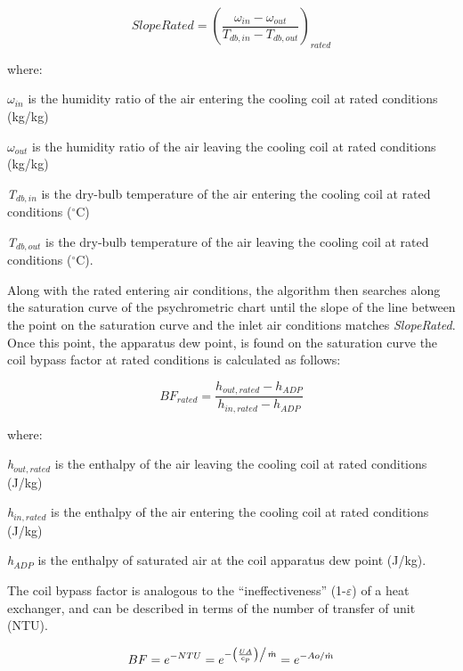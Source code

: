 \begin{equation}
SlopeRated = {\left( {\frac{{{\omega_{in}} - {\omega_{out}}}}{{{T_{db,in}} - {T_{db,out}}}}} \right)_{rated}}
\end{equation}

where:

\emph{\(\omega_{in}\)} is the humidity ratio of the air entering the cooling coil at rated conditions (kg/kg)

\emph{\(\omega_{out}\)} is the humidity ratio of the air leaving the cooling coil at rated conditions (kg/kg)

\emph{T\(_{db,in}\)} is the dry-bulb temperature of the air entering the cooling coil at rated conditions (\(^{\circ}\)C)

\emph{T\(_{db,out}\)} is the dry-bulb temperature of the air leaving the cooling coil at rated conditions (\(^{\circ}\)C).

Along with the rated entering air conditions, the algorithm then searches along the saturation curve of the psychrometric chart until the slope of the line between the point on the saturation curve and the inlet air conditions matches \emph{SlopeRated}. Once this point, the apparatus dew point, is found on the saturation curve the coil bypass factor at rated conditions is calculated as follows:

\begin{equation}
B{F_{rated}} = \frac{{{h_{out,rated}} - {h_{ADP}}}}{{{h_{in,rated}} - {h_{ADP}}}}
\end{equation}

where:

\emph{h\(_{out,rated}\)} is the enthalpy of the air leaving the cooling coil at rated conditions (J/kg)

\emph{h\(_{in,rated}\)} is the enthalpy of the air entering the cooling coil at rated conditions (J/kg)

\emph{h\(_{ADP}\)} is the enthalpy of saturated air at the coil apparatus dew point (J/kg).

The coil bypass factor is analogous to the ``ineffectiveness'' (1-\(\varepsilon\)) of a heat exchanger, and can be described in terms of the number of transfer of unit (NTU).

\begin{equation}
BF = {e^{ - NTU}} = {e^{{{ - \left( {\frac{{UA}}{{{c_p}}}} \right)} \mathord{\left/ {\vphantom {{ - \left( {\frac{{UA}}{{{c_p}}}} \right)} {\dot m}}} \right. } {\dot m}}}} = {e^{ - Ao/\dot m}}
\end{equation}

